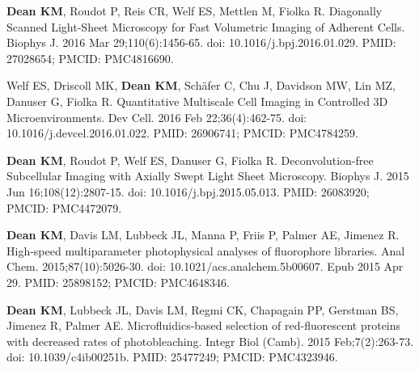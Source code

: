\begin{etaremune}
\item \textbf{Dean KM}, Roudot P, Reis CR, Welf ES, Mettlen M, Fiolka R. Diagonally Scanned Light-Sheet Microscopy for Fast Volumetric Imaging of Adherent Cells. Biophys J. 2016 Mar 29;110(6):1456-65. doi: 10.1016/j.bpj.2016.01.029. PMID: 27028654; PMCID: PMC4816690.

\item Welf ES, Driscoll MK, \textbf{Dean KM}, Schäfer C, Chu J, Davidson MW, Lin MZ, Danuser G, Fiolka R. Quantitative Multiscale Cell Imaging in Controlled 3D Microenvironments. Dev Cell. 2016 Feb 22;36(4):462-75. doi: 10.1016/j.devcel.2016.01.022. PMID: 26906741; PMCID: PMC4784259.

\item \textbf{Dean KM}, Roudot P, Welf ES, Danuser G, Fiolka R. Deconvolution-free Subcellular Imaging with Axially Swept Light Sheet Microscopy. Biophys J. 2015 Jun 16;108(12):2807-15. doi: 10.1016/j.bpj.2015.05.013. PMID: 26083920; PMCID: PMC4472079.

\item \textbf{Dean KM}, Davis LM, Lubbeck JL, Manna P, Friis P, Palmer AE, Jimenez R. High-speed multiparameter photophysical analyses of fluorophore libraries. Anal Chem. 2015;87(10):5026-30. doi: 10.1021/acs.analchem.5b00607. Epub 2015 Apr 29. PMID: 25898152; PMCID: PMC4648346.

\item \textbf{Dean KM}, Lubbeck JL, Davis LM, Regmi CK, Chapagain PP, Gerstman BS, Jimenez R, Palmer AE. Microfluidics-based selection of red-fluorescent proteins with decreased rates of photobleaching. Integr Biol (Camb). 2015 Feb;7(2):263-73. doi: 10.1039/c4ib00251b. PMID: 25477249; PMCID: PMC4323946.


\end{etaremune}
